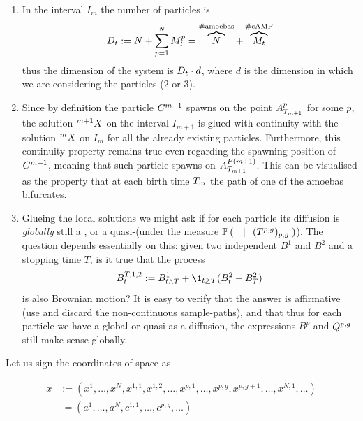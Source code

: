 \begin{remark}
\begin{enumerate}
\item In the interval $I_m$ the number of particles is
\begin{equation}
D_t := N + \sum_{p=1}^N M_t^p = \overbrace{N}^{\# \text{amoebas}} + \overbrace{M_t}^{\# \text{cAMP}}
\end{equation}
thus the dimension of the system is $D_t \cdot d$, where $d$ is the dimension in which we are considering the particles ($2$ or $3$).
\label{ch2:dimension-system}
\item Since by definition the particle $C^{m+1}$ spawns on the point $A_{T_{m+1}}^p$ for some $p$, the solution ${}^{m+1}X$ on the interval $I_{m+1}$ is glued with continuity with the solution ${}^{m}X$ on $I_{m}$ for all the already existing particles.
Furthermore, this continuity property remains true even regarding the spawning position of $C^{m+1}$, meaning that such particle spawns on $A_{T_{m+1}}^{P(m+1)}$.
This can be visualised as the property that at each birth time $T_m$ the path of one of the amoebas bifurcates.
\label{ch2:system-continuous-glueing}
\item Glueing the local solutions we might ask if for each particle its diffusion is \emph{globally} still a \Bm, or a quasi-\Bm (under the measure $\mathbb{P} \left( \; \left. \;  \; \right| \; \;(T^{p,g})_{p,g}  \; \right)$).
The question depends essentially on this: \invquest given two independent \Bm $B^1$ and $B^2$ and a stopping time $T$, is it true that the process
\begin{equation*}
B^{T,1,2}_t := B_{t \wedge T} ^1 + \1_{t\geq T} (B_t^2 - B_T^2)
\end{equation*}
is also Brownian motion?
It is easy to verify that the answer is affirmative (use \eg \autocite[Proposition 2.3]{le-gall} and discard the non-continuous sample-paths), and that thus for each particle we have a global \Bm or quasi-\Bm as a diffusion, \ie the expressions $B^p$ and $Q^{p,g}$ still make sense globally.
\end{enumerate}
\end{remark}



Let us sign the coordinates of space as 

\begin{align*}
x &:= (x^1, \ldots, x^N, x^{1,1}, x^{1,2}, \ldots, x^{p,1},\ldots, x^{p,g},x^{p,g+1},\ldots, x^{N,1}, \ldots)
\\
	&\ = (a^1, \ldots, a^N, c^{1,1}, \ldots, c^{p,g}, \ldots) 
\end{align*}

